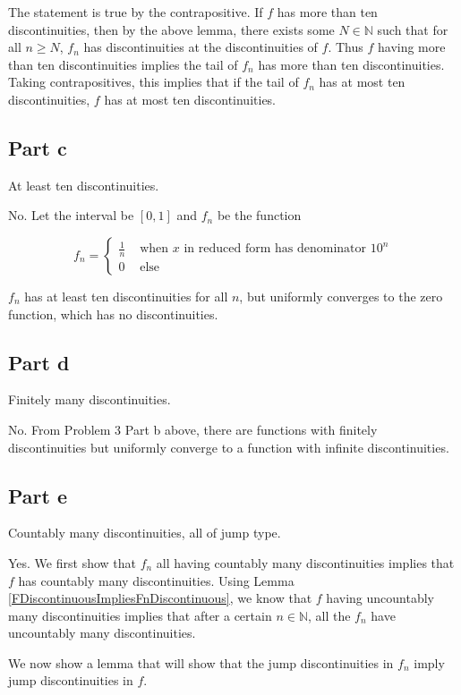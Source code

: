 \documentclass{article}
\newcommand{\N}{\mathbb{N}}
\begin{document}
The statement is true by the contrapositive. If $f$ has more than ten discontinuities, then by the above lemma, there exists some $N \in \N$ such that for all $n \geq N$, $f_n$ has discontinuities at the discontinuities of $f$. Thus $f$ having more than ten discontinuities implies the tail of $f_n$ has more than ten discontinuities. Taking contrapositives, this implies that if the tail of $f_n$ has at most ten discontinuities, $f$ has at most ten discontinuities.

\subsection*{Part c}

At least ten discontinuities.

No. Let the interval be $[0, 1]$ and $f_n$ be the function

\[
f_n = 
\begin{cases}
\frac{1}{n} & \text{ when } x \text{ in reduced form has denominator } 10^n \\
0 & \text{ else}
\end{cases}
\]

$f_n$ has at least ten discontinuities for all $n$, but uniformly converges to the zero function, which has no discontinuities.

\subsection*{Part d}

Finitely many discontinuities.

No. From Problem 3 Part b above, there are functions with finitely discontinuities but uniformly converge to a function with infinite discontinuities.

\subsection*{Part e}

Countably many discontinuities, all of jump type.

Yes. We first show that $f_n$ all having countably many discontinuities implies that $f$ has countably many discontinuities. Using Lemma \ref{FDiscontinuousImpliesFnDiscontinuous}, we know that $f$ having uncountably many discontinuities implies that after a certain $n \in \N$, all the $f_n$ have uncountably many discontinuities.

We now show a lemma that will show that the jump discontinuities in $f_n$ imply jump discontinuities in $f$.
\end{document}
